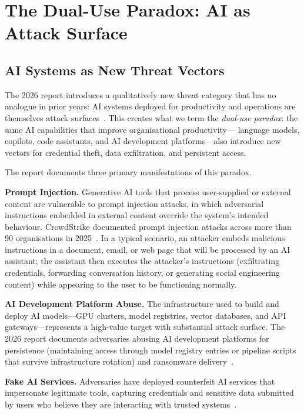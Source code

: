 \documentclass[journal]{IEEEtran}
\begin{document}
\section{The Dual-Use Paradox: AI as Attack Surface}
\label{sec:dual_use}

\subsection{AI Systems as New Threat Vectors}

The 2026 report introduces a qualitatively new threat category that has no analogue
in prior years: AI systems deployed for productivity and operations are themselves
attack surfaces~\cite{cs2026press}. This creates what we term the \emph{dual-use
paradox}: the same AI capabilities that improve organisational productivity---
language models, copilots, code assistants, and AI development platforms---also
introduce new vectors for credential theft, data exfiltration, and persistent access.

The report documents three primary manifestations of this paradox.

\textbf{Prompt Injection.} Generative AI tools that process user-supplied or
external content are vulnerable to prompt injection attacks, in which adversarial
instructions embedded in external content override the system's intended behaviour.
CrowdStrike documented prompt injection attacks across more than 90 organisations
in 2025~\cite{cs2026press}. In a typical scenario, an attacker embeds malicious
instructions in a document, email, or web page that will be processed by an
AI assistant; the assistant then executes the attacker's instructions (exfiltrating
credentials, forwarding conversation history, or generating social engineering
content) while appearing to the user to be functioning normally.

\textbf{AI Development Platform Abuse.} The infrastructure used to build and deploy
AI models---GPU clusters, model registries, vector databases, and API
gateways---represents a high-value target with substantial attack surface.
The 2026 report documents adversaries abusing AI development platforms for
persistence (maintaining access through model registry entries or pipeline scripts
that survive infrastructure rotation) and ransomware delivery~\cite{cs2026press}.

\textbf{Fake AI Services.} Adversaries have deployed counterfeit AI services that
impersonate legitimate tools, capturing credentials and sensitive data submitted
by users who believe they are interacting with trusted systems~\cite{itpro2026}.
\end{document}
